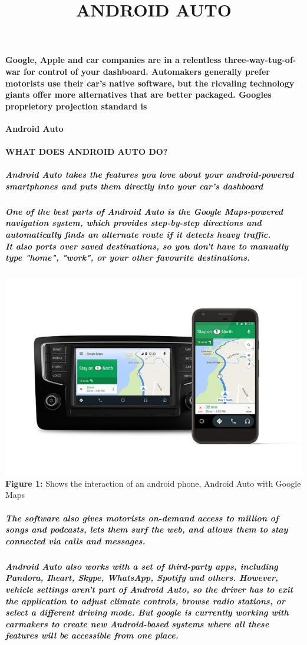 \documentclass[a4paper, 12pt]{article}
\begin{document}
\title{\textbf{ANDROID AUTO}}
\date{}
\maketitle
\paragraph{Google, Apple and car companies are in a relentless
three-way-tug-of-war for control of your dashboard. Automakers generally prefer motorists use their car's native software, but the ricvaling technology giants offer more alternatives that are better packaged. Googles proprietory projection standard is} \textbf{Android Auto}
\paragraph{\textbf{WHAT DOES ANDROID AUTO DO?}}
\subparagraph{Android Auto takes the features you love about your android-powered smartphones and puts them directly into your car's dashboard}
\subparagraph{One of the best parts of Android Auto is the Google Maps-powered navigation system, which provides step-by-step directions and automatically finds an alternate route if it detects heavy traffic.\\
It also ports over saved destinations, so you don't have to manually type "home", "work", or your other favourite destinations.}
\includegraphics[width=\textwidth]{map}
\textbf{Figure 1:} Shows the interaction of an android phone, Android Auto with Google Maps
\subparagraph{The software also gives motorists on-demand access to million of songs
and podcasts, lets them surf the web, and allows them to stay connected via calls and messages.}
\subparagraph{Android Auto also works with a set of third-party apps, including Pandora, Iheart, Skype, WhatsApp, Spotify and others. However, vehicle settings aren't part of Android Auto, so the driver has to exit the application to adjust climate controls, browse radio stations, or select a different driving mode. But google is currently working with carmakers to create new Android-based systems where all these features will be accessible from one place.}
\end{document}

